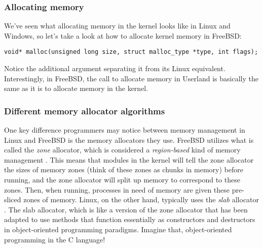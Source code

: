 \documentclass[letterpaper,10pt,titlepage]{article}
\begin{document}
\subsubsection{Allocating memory}
We've seen what allocating memory in the kernel looks like in Linux and Windows, so let's take a look at how to allocate kernel memory in FreeBSD: \cite{freeBSD2}
\begin{lstlisting}
void* malloc(unsigned long size, struct malloc_type *type, int flags);
\end{lstlisting}
Notice the additional argument separating it from its Linux equivalent. Interestingly, in FreeBSD, the call to allocate memory in Userland is basically the same as it is to allocate memory in the kernel. 
\subsubsection{Different memory allocator algorithms}
One key difference programmers may notice between memory management in Linux and FreeBSD is the memory allocators they use. FreeBSD utilizes what is called the \emph{zone} allocator, which is considered a \emph{region-based} kind of memory management \cite{freeBSD3}. This means that modules in the kernel will tell the zone allocator the sizes of memory zones (think of these zones as chunks in memory) before running, and the zone allocator will split up memory to correspond to these zones. Then, when running, processes in need of memory are given these pre-sliced zones of memory. Linux, on the other hand, typically uses the \emph{slab} allocator \cite{linux2}. The slab allocator, which is like a version of the zone allocator that has been adapted to use methods that function essentially as constructors and destructors in object-oriented programming paradigms. Imagine that, object-oriented programming in the C language! 
\newpage
{}

\end{document}
